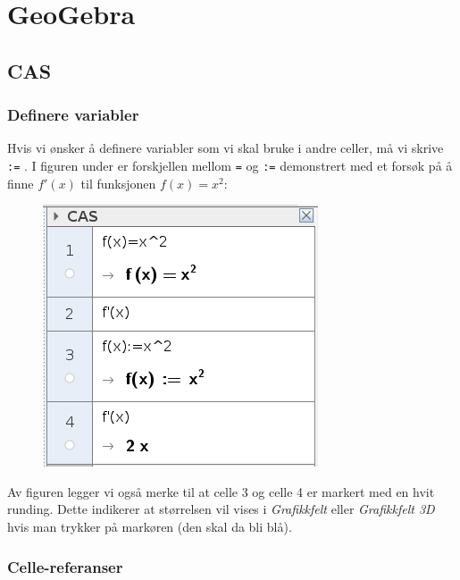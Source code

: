 




\section{GeoGebra}	
\subsection{CAS}	
\subsubsection{Definere variabler \label{defvar}}
Hvis vi ønsker å definere variabler som vi skal bruke i andre celler, må vi skrive \texttt{:=} . I figuren under er forskjellen mellom \texttt{=} og \texttt{:=} demonstrert med et forsøk på å finne $ f'(x) $ til funksjonen $ f(x)=x^2 $:
\begin{figure}
	\centering
	\includegraphics[scale=0.5]{fig/fder}
\end{figure}
Av figuren legger vi også merke til at celle 3 og celle 4 er markert med en hvit runding. Dette indikerer at størrelsen vil vises i \textsl{Grafikkfelt} eller \textsl{Grafikkfelt 3D} hvis man trykker på markøren (den skal da bli blå).
\subsubsection{Celle-referanser}

